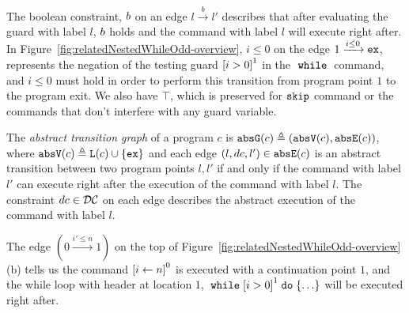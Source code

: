 
The boolean constraint, $b$ on an edge $l \xrightarrow{b} l'$ describes
that after evaluating the guard with label $l$,
$b$ holds and the command with label $l$ will execute right after.
In Figure~\ref{fig:relatedNestedWhileOdd-overview}, $i \leq 0 $ on the edge $1 \xrightarrow{i \leq 0} \mathtt{ex}$, 
represents the negation of the testing guard $\clabel{i > 0}^1$
in the $\;\mathtt{while}\;$ command, and $i \leq 0$ must hold in order to perform this transition from program point $1$ to
the program exit. 
We also have $\top$, which is preserved for $\mathtt{skip}$ command or the commands that don't interfere with any guard variable.



\begin{defn}
 \label{def:abs_cfg}
 The \emph{abstract transition graph} of a program $c$ is $\mathtt{abs}{\mathtt{G}}(c) \triangleq (\mathtt{abs}{\mathtt{V}}(c), \mathtt{abs}{\mathtt{E}}(c))$, where
 $\mathtt{abs}{\mathtt{V}}(c) \triangleq \mathtt{L}(c)\cup\{\mathtt{ex}\}$
 and 
 each edge $(l, dc, l') \in \mathtt{abs}{\mathtt{E}}(c)$ is an abstract transition
between two program points $l, l'$ if and only if
the command with label $l'$ can execute right after the execution of the command with label $l$.
The constraint $dc \in \mathcal{DC}$ on each edge
describes the abstract execution of the command with label $l$.
\end{defn}
The edge $(0 \xrightarrow{i' \leq n} 1)$ on the top of Figure~\ref{fig:relatedNestedWhileOdd-overview}(b) tells us the command 
$\clabel{\assign{i}{n}}^0$ is executed with a continuation point $1$, and the while loop with header at location $1$, $\ewhile \clabel{i > 0}^1 \edo \{\ldots\}$ will be executed right after.

